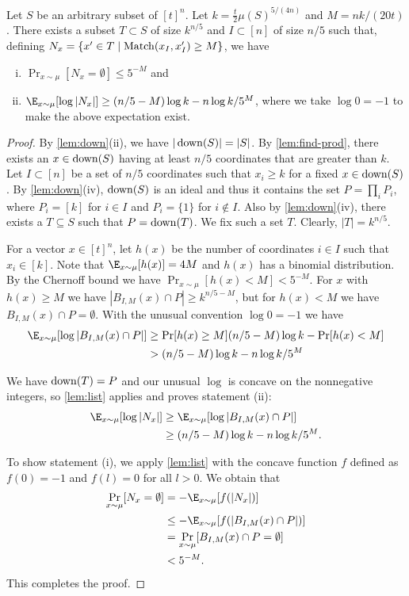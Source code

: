 \begin{theorem}
\label{thm:isoperimetry}
Let $S$ be an arbitrary subset of $[t]^n$. Let
$k=\frac{t}{2}\mu(S)^{5/(4n)}$ and $M = nk/(20t)$. There exists
a subset $T\subset S$ of size $k^{n/5}$ and $I\subset [n]$ of
size $n/5$ such that, defining $N_x=\{x'\in
T\mid\operatorname{Match}(x_I,x'_I)\ge M\}$, we have
\begin{enumerate}[(i)]
\item $\Pr_{x\sim\mu}[N_x=\emptyset] \le 5^{-M}$ and
\item $\E_{x\sim \mu}[\log|N_x|]\geq (n/5-M)\log k - 
n\log k /5^M$, where we take $\log 0 = -1$ to make the above 
expectation exist.
\end{enumerate}
\end{theorem}
\begin{proof}
By \autoref{lem:down}(ii), we have $|\operatorname{down}(S)|=|S|$. By
\autoref{lem:find-prod}, there exists an $x\in\operatorname{down}(S)$ having
at least $n/5$ coordinates that are greater than $k$. Let
$I\subset[n]$ be a set of $n/5$ coordinates such that $x_i\geq
k$ for a fixed $x\in\operatorname{down}(S)$. By \autoref{lem:down}(iv),
$\operatorname{down}(S)$ is an ideal and thus it contains the set
$P=\prod_iP_i$, where $P_i=[k]$ for $i\in I$ and $P_i=\{1\}$ for
$i\notin I$. Also by \autoref{lem:down}(iv), there exists a
$T\subseteq S$ such that $P = \operatorname{down}(T)$. We fix such a set $T$.
Clearly, $|T|=k^{n/5}$.

For a vector $x\in[t]^n$, let $h(x)$ be the number of
coordinates $i\in I$ such that $x_i\in [k]$. Note that
$\E_{x\sim \mu}[h(x)] = 4M$ and $h(x)$ has a binomial
distribution. By the Chernoff bound we have $\Pr_{x\sim
\mu}[h(x)<M] < 5^{-M}$. For $x$ with $h(x)\ge M$ we have
$|B_{I,M}(x)\cap P|\ge k^{n/5-M}$, but for $h(x)<M$ we have
$B_{I,M}(x)\cap P=\emptyset$. With the unusual convention
$\log0=-1$ we have
\begin{align*}
\E_{x\sim \mu} [\log|B_{I,M}(x)\cap P|]
&\ge\Pr[h(x)\ge M](n/5-M)\log k-\Pr[h(x)<M]\\
&>(n/5-M)\log k-n\log k/5^M
\end{align*}

We have $\operatorname{down}(T)=P$ and our unusual $\log$ is concave on the
nonnegative integers, so \autoref{lem:list} applies and proves
statement (ii):
\begin{align*}
\E_{x\sim \mu}[\log |N_x|] &\ge\E_{x\sim \mu} 
[\log|B_{I,M}(x)\cap P|]\\
&\ge(n/5-M)\log k - n\log k /5^M.
\end{align*}

To show statement (i), we apply \autoref{lem:list} with the
concave function $f$ defined as $f(0)=-1$ and $f(l)=0$ for all
$l>0$. We obtain that
\begin{align*}
\Pr_{x\sim\mu}[N_x=\emptyset]
&=-\E_{x\sim\mu}[f(|N_x|)]\\
&\le-\E_{x\sim\mu}[f(|B_{I,M}(x)\cap P|)]\\
&=\Pr_{x\sim\mu}[B_{I,M}(x)\cap P=\emptyset]\\
&<5^{-M}.
\end{align*}
This completes the proof.
\end{proof}
